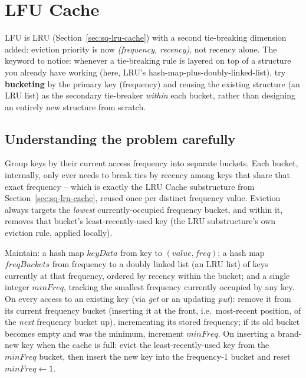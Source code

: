 \section{LFU Cache}
\label{sec:sq-lfu-cache}


\begin{patternbox}
LFU is LRU (Section~\ref{sec:sq-lru-cache}) with a second tie-breaking
dimension added: eviction priority is now \emph{(frequency, recency)},
not recency alone. The keyword to notice: whenever a tie-breaking rule is
layered on top of a structure you already have working (here, LRU's
hash-map-plus-doubly-linked-list), try \textbf{bucketing} by the primary
key (frequency) and reusing the existing structure (an LRU list) as the
secondary tie-breaker \emph{within} each bucket, rather than designing an
entirely new structure from scratch.
\end{patternbox}

\subsection*{Understanding the problem carefully}

Group keys by their current access frequency into separate buckets. Each
bucket, internally, only ever needs to break ties by recency among keys
that share that exact frequency -- which is exactly the LRU Cache
substructure from Section~\ref{sec:sq-lru-cache}, reused once per
distinct frequency value. Eviction always targets the \emph{lowest}
currently-occupied frequency bucket, and within it, removes that
bucket's least-recently-used key (the LRU substructure's own eviction
rule, applied locally).

\begin{ideabox}
Maintain: a hash map $\textit{keyData}$ from key to $(\textit{value},
\textit{freq})$; a hash map $\textit{freqBuckets}$ from frequency to a
doubly linked list (an LRU list) of keys currently at that frequency,
ordered by recency within the bucket; and a single integer
$\textit{minFreq}$, tracking the smallest frequency currently occupied by
any key. On every access to an existing key (via \textit{get} or an
updating \textit{put}): remove it from its current frequency bucket
(inserting it at the front, i.e.\ most-recent position, of the
\emph{next} frequency bucket up), incrementing its stored frequency; if
its old bucket becomes empty and was the minimum, increment
$\textit{minFreq}$. On inserting a brand-new key when the cache is full:
evict the least-recently-used key from the $\textit{minFreq}$ bucket, then
insert the new key into the frequency-$1$ bucket and reset
$\textit{minFreq} \gets 1$.
\end{ideabox}

